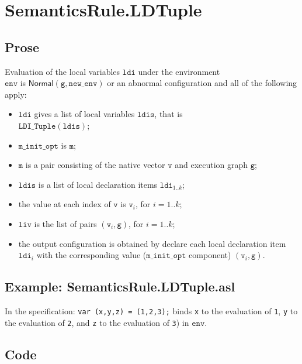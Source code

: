 \documentclass{book}
\newcommand\Normal[0]{\textsf{Normal}}
\newcommand\newenv[0]{\texttt{new\_env}}
\newcommand\env[0]{\texttt{env}}
\newcommand\vg[0]{\texttt{g}}
\newcommand\vm[0]{\texttt{m}}
\newcommand\vv[0]{\texttt{v}}
\newcommand\ldi[0]{\texttt{ldi}}
\newcommand\ldis[0]{\texttt{ldis}}
\newcommand\liv[0]{\texttt{liv}}
\newcommand\minitopt[0]{\texttt{m\_init\_opt}}
\begin{document}
\section{SemanticsRule.LDTuple \label{sec:SemanticsRule.LDTuple}}
    \subsection{Prose}
    Evaluation of the local variables $\ldi$ under the environment \\
    $\env$ is $\Normal(\vg, \newenv)$ or an abnormal configuration
    and all of the following apply:
    \begin{itemize}
    \item $\ldi$ gives a list of local variables $\ldis$, that is \\
    $\texttt{LDI\_Tuple}(\ldis)$;
    \item $\minitopt$ is $\vm$;
    \item $\vm$ is a pair consisting of the native vector $\vv$ and execution graph $\vg$;
    \item $\ldis$ is a list of local declaration items $\ldi_{1..k}$;
    \item the value at each index of $\vv$ is $\vv_i$, for $i=1..k$;
    \item $\liv$ is the list of pairs $(\vv_i, \vg)$, for $i=1..k$;
    \item the output configuration is obtained by declare each local declaration item $\ldi_i$
    with the corresponding value ($\minitopt$ component) $(\vv_i, \vg)$.
    \end{itemize}

    \subsection{Example: SemanticsRule.LDTuple.asl}
    In the specification:
    \texttt{var (x,y,z) = (1,2,3);} binds \texttt{x} to the evaluation of
\texttt{1}, \texttt{y} to the evaluation of \texttt{2}, and \texttt{z} to the
evaluation of \texttt{3}) in $\env$.

  \subsection{Code}
\end{document}
